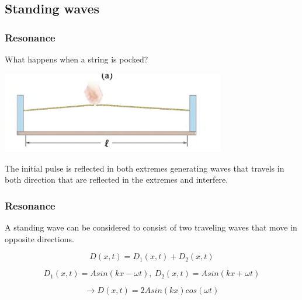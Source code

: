 \documentclass[]{beamer}
\begin{document}

\subsection{Standing waves  }






\begin{frame}
\frametitle{Resonance}

What happens when a string is pocked?


  \begin{center}
  \includegraphics[height=1.4in]{images4/19.jpg}
\end{center}

\pause

The initial pulse is reflected in both extremes generating waves that travels in both direction that are reflected in the extremes and interfere.
  \end{frame}



\begin{frame}
\frametitle{Resonance}

A standing wave can be considered to consist of two traveling waves that
move in opposite directions.

\begin{equation*}
D(x,t)=D_1(x,t)+D_2(x,t)
\end{equation*}

\pause

\begin{equation*}
D_1(x,t)=Asin(kx-\omega t),~D_2(x,t)=Asin(kx+\omega t)
\end{equation*}


\begin{equation}
\rightarrow D(x,t)=2Asin(kx)cos(\omega t)
\end{equation}


  \end{frame}


\end{document}
